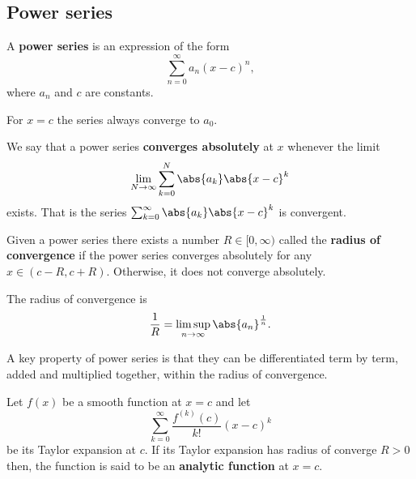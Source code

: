 \documentclass[12pt, a4paper]{article}
\begin{document}
\subsection{Power series}

\begin{definition}
    A \textbf{power series} is an expression of the form 
    \[\sum_{n=0}^{\infty} a_n (x-c)^n,\]
    where \(a_n\) and \(c\) are constants.
\end{definition}

\begin{mdremark}
    For \(x=c\) the series always converge to \(a_0\).
\end{mdremark}

\begin{definition}
    We say that a power series \textbf{converges absolutely} at \(x\) whenever the limit 
    \[\lim_{N\to \infty} \sum_{k=0}^{N} \abs{a_k} \abs{x-c}^k\]
    exists. That is the series \(\sum_{k=0}^{\infty} \abs{a_k} \abs{x-c}^k\) is convergent.
\end{definition}

\begin{definition}
    Given a power series there exists a number \(R\in[0,\infty)\) called the \textbf{radius of convergence} if the power series converges absolutely for any \(x \in (c-R,c+R)\). Otherwise, it does not converge absolutely.
\end{definition}

\begin{mdthm}
    The radius of convergence is 
    \[\frac{1}{R} = \limsup_{n \to \infty} \abs{a_n}^{\frac{1}{n}}.\]
\end{mdthm}

\begin{mdremark}
    A key property of power series is that they can be differentiated term by term, added and multiplied together, within the radius of convergence.
\end{mdremark}

\begin{definition}
    Let \(f(x)\) be a smooth function at \(x=c\) and let 
    \[\sum_{k=0}^{\infty} \frac{f^{(k)}(c)}{k!}(x-c)^k\]
    be its Taylor expansion at \(c\). If its Taylor expansion has radius of converge \(R>0\) then, the function is said to be an \textbf{analytic function} at \(x=c\).
\end{definition}
\end{document}
